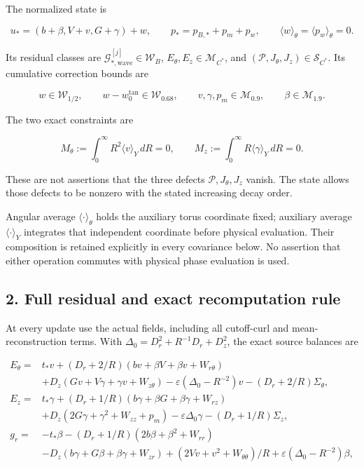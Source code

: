 \documentclass[10pt,a4paper]{article}
\begin{document}
The normalized state is

\[
u_*=(b+\beta,V+v,G+\gamma)+w,\qquad
p_*=p_{B,*}+p_m+p_w,\qquad
\langle w\rangle_\theta=\langle p_w\rangle_\theta=0.
\tag{C3}
\]

Its residual classes are \(\mathcal G_{*,\mathrm{wave}}^{[j]}\in\mathcal W_B\), \(E_\theta,E_z\in\mathcal M_{C^*}\), and \((\mathcal P,J_\theta,J_z)\in\mathcal S_{C^*}\). Its cumulative correction bounds are

\[
w\in\mathcal W_{1/2},\qquad
w-w_0^{\mathrm{tan}}\in\mathcal W_{0.68},\qquad
v,\gamma,p_m\in\mathcal M_{0.9},\qquad
\beta\in\mathcal M_{1.9}.
\tag{C4}
\]

The two exact constraints are

\[
M_\theta:=\int_0^\infty R^2\langle v\rangle_Y\,dR=0,
\qquad
M_z:=\int_0^\infty R\langle\gamma\rangle_Y\,dR=0.
\tag{C5}
\]

These are not assertions that the three defects \(\mathcal P,J_\theta,J_z\) vanish. The state allows those defects to be nonzero with the stated increasing decay order.

Angular average \(\langle\cdot\rangle_\theta\) holds the auxiliary torus coordinate fixed; auxiliary average \(\langle\cdot\rangle_Y\) integrates that independent coordinate before physical evaluation. Their composition is retained explicitly in every covariance below. No assertion that either operation commutes with physical phase evaluation is used.

\subsection{2. Full residual and exact recomputation rule}\label{nsupstream:stage_cycle_gain_audit:full-residual-and-exact-recomputation-rule}

At every update use the actual fields, including all cutoff-curl and mean-reconstruction terms. With \(\Delta_0=D_r^2+R^{-1}D_r+D_z^2\), the exact source balances are

\[
\begin{aligned}
E_\theta={}&t_*v+(D_r+2/R)(bv+\beta V+\beta v+W_{r\theta})\\
&+D_z(Gv+V\gamma+\gamma v+W_{z\theta})
-\varepsilon(\Delta_0-R^{-2})v-(D_r+2/R)\Sigma_\theta,\\
E_z={}&t_*\gamma+(D_r+1/R)(b\gamma+\beta G+\beta\gamma+W_{rz})\\
&+D_z(2G\gamma+\gamma^2+W_{zz}+p_m)
-\varepsilon\Delta_0\gamma-(D_r+1/R)\Sigma_z,\\
g_r={}&-t_*\beta-(D_r+1/R)(2b\beta+\beta^2+W_{rr})\\
&-D_z(b\gamma+G\beta+\beta\gamma+W_{zr})
+(2Vv+v^2+W_{\theta\theta})/R
+\varepsilon(\Delta_0-R^{-2})\beta,
\end{aligned}
\tag{C6}
\]
\end{document}
